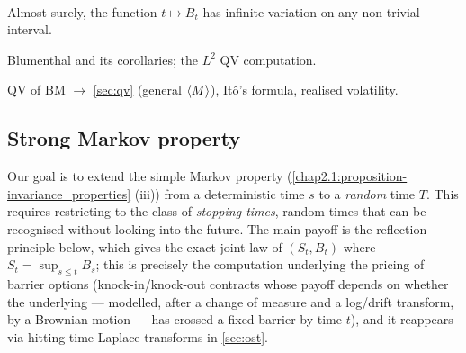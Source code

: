 \begin{corollary}\label{chap2.3:corollary-infinite_variation}
 \\
Almost surely, the function $t \mapsto B_t$ has infinite variation on any non-trivial interval.
\end{corollary}


\begin{quizbox} Blumenthal and its corollaries; the $L^2$ QV computation. \end{quizbox}
\begin{usedin} QV of BM $\to$ \cref{sec:qv} (general $\langle M\rangle$), Itô's formula, realised volatility. \end{usedin}

\subsection{Strong Markov property}
Our goal is to extend the simple Markov property (\cref{chap2.1:proposition-invariance_properties} (iii)) from a deterministic time $s$ to a \textit{random} time $T$. This requires restricting to the class of \textit{stopping times}, random times that can be recognised without looking into the future. The main payoff is the reflection principle below, which gives the exact joint law of $(S_t,B_t)$ where $S_t=\sup_{s\le t}B_s$; this is precisely the computation underlying the pricing of barrier options (knock-in/knock-out contracts whose payoff depends on whether the underlying --- modelled, after a change of measure and a log/drift transform, by a Brownian motion --- has crossed a fixed barrier by time $t$), and it reappears via hitting-time Laplace transforms in \cref{sec:ost}.


